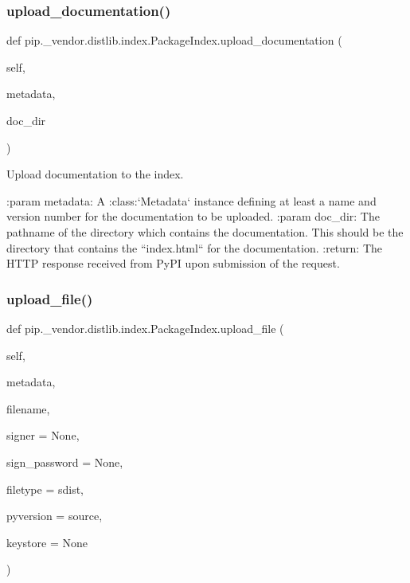 \subsubsection{\texorpdfstring{upload\+\_\+documentation()}{upload\_documentation()}}
{\footnotesize\ttfamily def pip.\+\_\+vendor.\+distlib.\+index.\+Package\+Index.\+upload\+\_\+documentation (\begin{DoxyParamCaption}\item[{}]{self,  }\item[{}]{metadata,  }\item[{}]{doc\+\_\+dir }\end{DoxyParamCaption})}

\begin{DoxyVerb}Upload documentation to the index.

:param metadata: A :class:`Metadata` instance defining at least a name
         and version number for the documentation to be
         uploaded.
:param doc_dir: The pathname of the directory which contains the
        documentation. This should be the directory that
        contains the ``index.html`` for the documentation.
:return: The HTTP response received from PyPI upon submission of the
request.
\end{DoxyVerb}
 \mbox{\label{classpip_1_1__vendor_1_1distlib_1_1index_1_1PackageIndex_ac0d22630f5bafe54842ca287b142ea84}} 
\subsubsection{\texorpdfstring{upload\+\_\+file()}{upload\_file()}}
{\footnotesize\ttfamily def pip.\+\_\+vendor.\+distlib.\+index.\+Package\+Index.\+upload\+\_\+file (\begin{DoxyParamCaption}\item[{}]{self,  }\item[{}]{metadata,  }\item[{}]{filename,  }\item[{}]{signer = {\ttfamily None},  }\item[{}]{sign\+\_\+password = {\ttfamily None},  }\item[{}]{filetype = {\ttfamily \textquotesingle{}sdist\textquotesingle{}},  }\item[{}]{pyversion = {\ttfamily \textquotesingle{}source\textquotesingle{}},  }\item[{}]{keystore = {\ttfamily None} }\end{DoxyParamCaption})}

